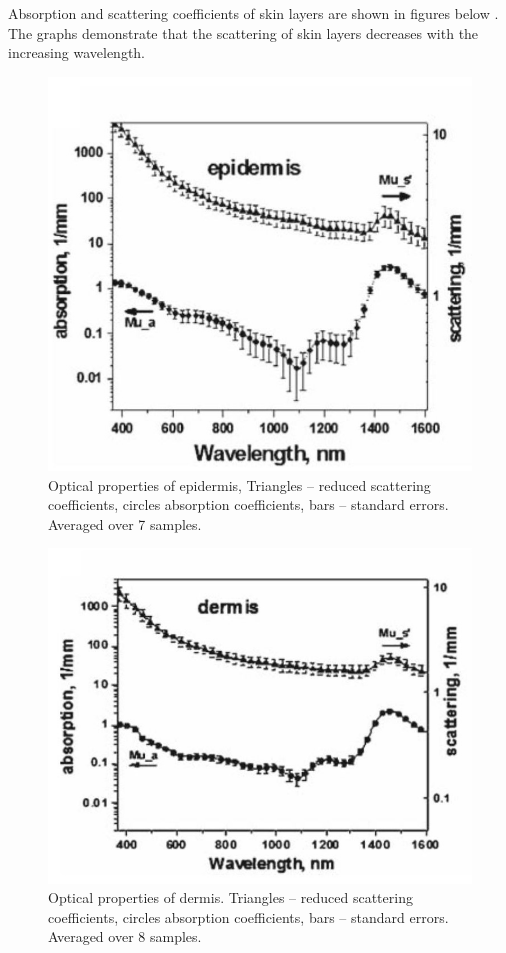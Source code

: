Absorption and scattering coefficients of skin layers are shown in figures below \parencite{skin1}. The graphs demonstrate that the scattering of skin layers decreases with the increasing wavelength. 


\begin{figure}[H]
\centering
\includegraphics[scale=0.5]{figures/epidermis.JPG}
\caption[Optical properties of epidermis]{Optical properties of epidermis, Triangles – reduced scattering coefficients, circles absorption coefficients, bars – standard errors. Averaged over 7 samples.}\label{fig:epidermis}
\end{figure}





\begin{figure}[H]
\centering
\includegraphics[scale=0.5]{figures/dermis.JPG}
\caption[Optical properties of dermis]{Optical properties of dermis. Triangles – reduced scattering coefficients,  circles absorption coefficients, bars – standard errors. Averaged over 8 samples.}\label{fig:dermis}
\end{figure}


